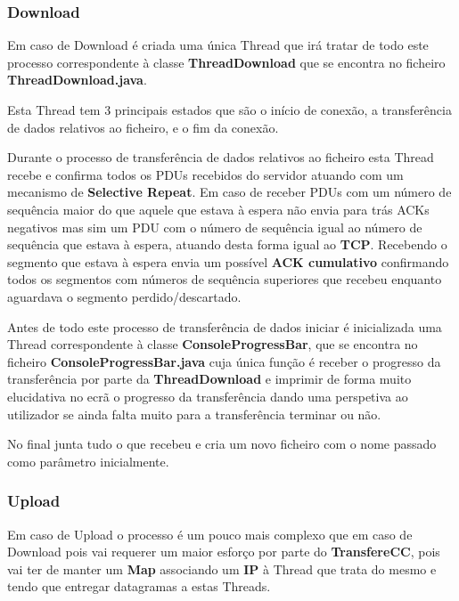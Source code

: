 \documentclass{llncs}
\begin{document}
\subsubsection{Download}

\hspace{20.0cm}

Em caso de Download é criada uma única Thread que irá tratar de todo este processo correspondente à classe \textbf{ThreadDownload} que se encontra no ficheiro \textbf{ThreadDownload.java}.

Esta Thread tem 3 principais estados que são o início de conexão, a transferência de dados relativos ao ficheiro, e o fim da conexão.

Durante o processo de transferência de dados relativos ao ficheiro esta Thread recebe e confirma todos os PDUs recebidos do servidor atuando com um mecanismo de \textbf{Selective Repeat}. Em caso de receber PDUs com um número de sequência maior do que aquele que estava à espera não envia para trás ACKs negativos mas sim um PDU com o número de sequência igual ao número de sequência que estava à espera, atuando desta forma igual ao \textbf{TCP}. Recebendo o segmento que estava à espera envia um possível \textbf{ACK cumulativo} confirmando todos os segmentos com números de sequência superiores que recebeu enquanto aguardava o segmento perdido/descartado.

Antes de todo este processo de transferência de dados iniciar é inicializada uma Thread correspondente à classe \textbf{ConsoleProgressBar}, que se encontra no ficheiro \textbf{ConsoleProgressBar.java} cuja única função é receber o progresso da transferência por parte da \textbf{ThreadDownload} e imprimir de forma muito elucidativa no ecrã o progresso da transferência dando uma perspetiva ao utilizador se ainda falta muito para a transferência terminar ou não.

No final junta tudo o que recebeu e cria um novo ficheiro com o nome passado como parâmetro inicialmente.


\subsubsection{Upload}

\hspace{20.0cm}

Em caso de Upload o processo é um pouco mais complexo que em caso de Download pois vai requerer um maior esforço por parte do \textbf{TransfereCC}, pois vai ter de manter um \textbf{Map} associando um \textbf{IP} à Thread que trata do mesmo e tendo que entregar datagramas a estas Threads.
\end{document}
